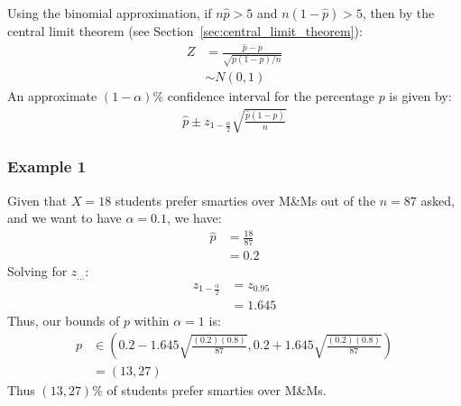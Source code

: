                     Using the binomial approximation, if $n\hat{p} > 5$ and $n (1 - \hat{p}) > 5$, then by the central limit theorem (see Section~\ref{sec:central_limit_theorem}):
                    \begin{align*}
                        Z &= \frac{\hat{p} - p}{\sqrt{p (1 - p) / n}} \\
                        &\sim N(0, 1)
                    \end{align*}
                    An approximate $(1-\alpha)\%$ confidence interval for the percentage $p$ is given by:
                    \begin{align*}
                        \hat{p} \pm z_{1 - \frac{\alpha}{2}} \sqrt{\frac{\hat{p}(1 - \hat{p})}{n}}
                    \end{align*}

                    \subsubsection{Example 1} %
                    \label{ssub:example_1}
                        Given that $X = 18$ students prefer smarties over M\&Ms out of the $n = 87$ asked, and we want to have $\alpha = 0.1$, we have:
                        \begin{align*}
                            \hat{p} &= \frac{18}{87} \\
                            &= 0.2
                        \end{align*}
                        Solving for $z_{\ldots}$:
                        \begin{align*}
                            z_{1 - \frac{\alpha}{2}} &= z_{0.95} \\
                            &= 1.645
                        \end{align*}
                        Thus, our bounds of $p$ within $\alpha = 1$ is:
                        \begin{align*}
                            p &\in (0.2 - 1.645 \sqrt{\frac{(0.2)(0.8)}{87}}, 0.2 + 1.645 \sqrt{\frac{(0.2)(0.8)}{87}}) \\
                            &= (13, 27)
                        \end{align*}
                        Thus $(13, 27)$\% of students prefer smarties over M\&Ms.
